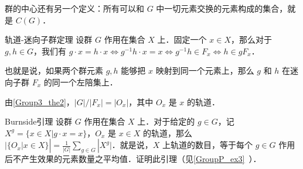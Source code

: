 群的中心还有另一个定义：所有可以和 $G$ 中一切元素交换的元素构成的集合，就是 $C(G)$．

\begin{theorem}{轨道-迷向子群定理}\label{Group3_the2}
设群 $G$ 作用在集合 $X$ 上．固定一个 $x\in X$，那么对于 $g, h\in G$，我们有 $g\cdot x=h\cdot x\iff g^{-1}h\cdot x=x\iff g^{-1}h\in F_x\iff h\in gF_x$．

也就是说，如果两个群元素 $g, h$ 能够把 $x$ 映射到同一个元素上，那么 $g$ 和 $h$ 在迷向子群 $F_x$ 的同一个左陪集上．
\end{theorem}

\begin{corollary}{}\label{Group3_cor1}
由\autoref{Group3_the2}，$|G|/|F_x|=|O_x|$，其中 $O_x$ 是 $x$ 的轨道．
\end{corollary}

\begin{exercise}{Burnside引理}\label{Group3_exe2}
设群 $G$ 作用在集合 $X$ 上．对于给定的 $g\in G$，记 $X^g=\{x\in X|g\cdot x=x\}$，$O_x$ 是 $x\in X$ 的轨道，那么 $|\{O_x|x\in X\}|=\frac{1}{|G|}\sum_{g\in G}|X^g|$．就是说，$X$ 上轨道的数目，等于每个 $g\in G$ 作用后不产生效果的元素数量之平均值．证明此引理（见\autoref{GroupP_ex3}~）．
\end{exercise}

